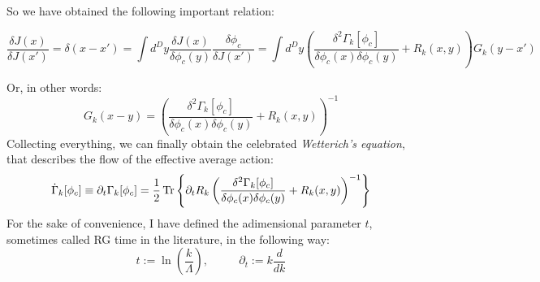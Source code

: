 So we have obtained the following important relation:
\begin{small}
\begin{equation}
 \frac{\delta J(x)}{\delta J(x')} = \delta(x - x') = \int d^D y\frac{\delta J(x)}{\delta \phi_c(y)}\frac{\delta \phi_c}{\delta J(x')} = \int d^D y\left(\frac{\delta^2 \Gamma_k[\phi_c]}{\delta \phi_c(x)\delta \phi_c(y)} + R_k(x,y) \right)G_k(y-x')
\end{equation}
\end{small}
Or, in other words:
\begin{equation}
 G_k(x - y) = \left(\frac{\delta^2 \Gamma_k[\phi_c]}{\delta \phi_c(x)\delta \phi_c(y)} + R_k(x,y)\right)^{-1}
\end{equation}
Collecting everything, we can finally obtain the celebrated \emph{Wetterich's equation}, that describes the flow of the 
effective average action:
\begin{equation}\label{wetterich}
 \dot{\Gamma}_k[\phi_c] \equiv \partial_t\Gamma_k[\phi_c] = \frac{1}{2}\operatorname{Tr}\left\{\partial_tR_k \left(\frac{\delta^2 \Gamma_k[\phi_c]}{\delta \phi_c(x)\delta \phi_c(y)} + R_k(x,y)\right)^{-1}\right\}
\end{equation}
For the sake of convenience, I have defined the adimensional parameter $t$, sometimes called RG time in the literature, in the following way:
\begin{equation}
 t := \ln \left(\frac{k}{\Lambda}\right), \ \ \ \ \ \ \ \ \ \ \ \ \partial_t := k \frac{d}{d k}
\end{equation}

